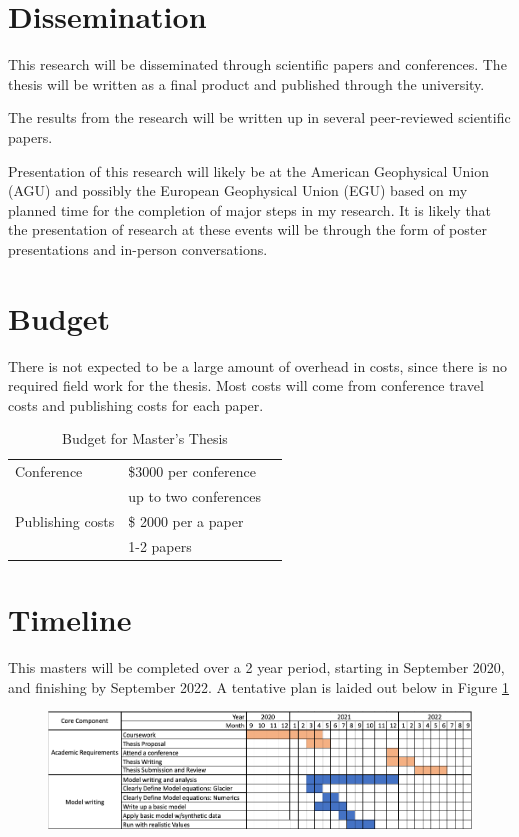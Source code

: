\documentclass{article}
\begin{document}
\section{Dissemination}
This research will be disseminated through scientific papers and conferences. The thesis will be written as a final product and published through the university.

The results from the research will be written up in several peer-reviewed scientific papers.

Presentation of this research will likely be at the American Geophysical Union (AGU) and possibly the European Geophysical Union (EGU) based on my planned time for the completion of major steps in my research. It is likely that the presentation of research at these events will be through the form of poster presentations and in-person conversations.

\section{Budget}
There is not expected to be a large amount of overhead in costs, since there is no required field work for the thesis. Most costs will come from conference travel costs and publishing costs for each paper. 

\begin{table}[h]
    \centering
    \begin{tabular}{lll}
    Conference
         &  \$3000 per conference\\
         & up to two conferences \\
    Publishing costs
        & \$ 2000 per a paper \\
        & 1-2 papers \\
    
    \end{tabular}
    \caption{Budget for Master's Thesis}
    \label{tab:my_label}
\end{table}

\section{Timeline}
This masters will be completed over a 2 year period, starting in September 2020, and finishing by September 2022. A tentative plan is laided out below in Figure \ref{fig:Timeline}

\begin{figure}[H]
    \centering
    \includegraphics[width=16cm]{GahnttChart.png}
    \caption{}
    \label{fig:Timeline}
\end{figure}



\end{document}

